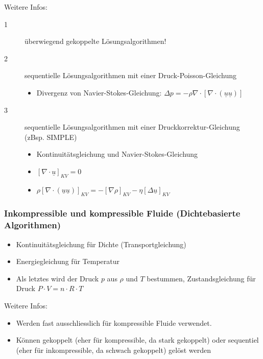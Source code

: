 \documentclass[a4paper]{scrartcl}
\begin{document}
Weitere Infos:
\begin{description}

  \item[1] überwiegend gekoppelte Lösungsalgorithmen!
  \item[2] sequentielle Lösungsalgorithmen mit einer Druck-Poisson-Gleichung
  \begin{itemize}
  	\item Divergenz von Navier-Stokes-Gleichung: $\Delta p = -\rho \nabla \cdot
  	[\nabla \cdot (\underline u \underline u)]$
  \end{itemize}
  \item[3] sequentielle Lösungsalgorithmen mit einer Druckkorrektur-Gleichung
  (zBsp. SIMPLE)
  \begin{itemize}
    \item Kontinuitätsgleichung und Navier-Stokes-Gleichung
    \item $[\nabla \cdot \underline u]_{KV} = 0$
    \item $\rho [\nabla \cdot (\underline u \underline u)]_{KV} = - [\nabla
    \rho]_{KV} - \eta [\Delta \underline u]_{KV}$
  \end{itemize}
\end{description}

\subsubsection{Inkompressible und kompressible Fluide (Dichtebasierte
Algorithmen)}
\begin{itemize}
  \item Kontinuitätsgleichung für Dichte (Transportgleichung)
  \item Energiegleichung für Temperatur
  \item Als letztes wird der Druck $p$ aus $\rho$ und $T$ bestummen,
  Zustandsgleichung für Druck $P \cdot V = n \cdot R \cdot T$
\end{itemize}

Weitere Infos:\\
\begin{itemize}
  \item Werden fast ausschliesslich für kompressible Fluide verwendet.\\
  \item Können gekoppelt (eher für kompressible, da stark gekoppelt) oder
  sequentiel (eher für inkompressible, da schwach gekoppelt) gelöst werden
\end{itemize}
\end{document}
